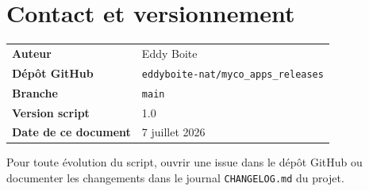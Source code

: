 \documentclass[11pt,a4paper]{article}
\begin{document}
\section*{Contact et versionnement}

\begin{table}[htbp]
  \centering
  \begin{tabular}{ll}
    \toprule
    \textbf{Auteur}          & Eddy Boite \\
    \textbf{Dépôt GitHub}    & \texttt{eddyboite-nat/myco\_apps\_releases} \\
    \textbf{Branche}         & \texttt{main} \\
    \textbf{Version script}  & 1.0 \\
    \textbf{Date de ce document} & 7 juillet 2026 \\
    \bottomrule
  \end{tabular}
\end{table}

Pour toute évolution du script, ouvrir une issue dans le dépôt GitHub
ou documenter les changements dans le journal \texttt{CHANGELOG.md} du projet.

\end{document}
